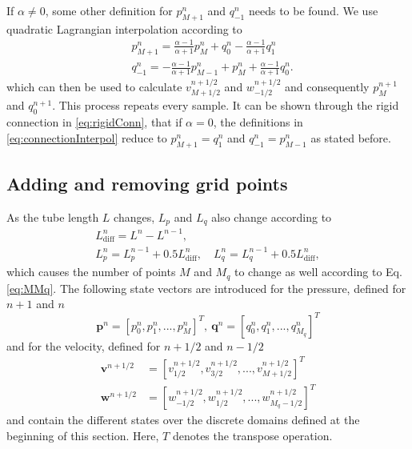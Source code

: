%
If $\alpha \neq 0$, some other definition for $p_{M+1}^n$ and $q_{-1}^n$ needs to be found. We use quadratic Lagrangian interpolation according to
\begin{subequations}\label{eq:connectionInterpol}
\begin{align}
        &p_{M+1}^n = \frac{\alpha - 1}{\alpha + 1}p_{M}^n + q_0^n - \frac{\alpha - 1}{\alpha + 1}q_1^n
    \label{eq:calcPMp1}\\
        &q_{-1}^n
        =-\frac{\alpha - 1}{\alpha + 1}p_{M-1}^n + p_{M}^n+ \frac{\alpha - 1}{\alpha + 1}q_{0}^n.\label{eq:calcQm1}
\end{align}
\end{subequations}
which can then be used to calculate $v_{M+1/2}^{n+1/2}$ and $w_{-1/2}^{n+1/2}$ and consequently $p_M^{n+1}$ and $q_0^{n+1}$. This process repeats every sample. It can be shown through the rigid connection in \eqref{eq:rigidConn}, that if $\alpha=0$, the definitions in \eqref{eq:connectionInterpol} reduce to $p_{M+1}^n = q_1^n$ and $q_{-1}^n = p_{M-1}^n$ as stated before.

\subsection{Adding and removing grid points}\label{sec:addRemove}
As the tube length $L$ changes, $L_p$ and $L_q$ also change according to
\begin{gather}
    L_\text{diff}^n = L^n-L^{n-1},\label{eq:lDiff} \\
    L_p^n = L_p^{n-1} + 0.5 L_\text{diff}^n, \quad L_q^n =  L_q^{n-1} + 0.5L_\text{diff}^n,  
\end{gather}
which causes the number of points $M$ and $M_q$ to change as well according to Eq. \eqref{eq:MMq}. The following state vectors are introduced for the pressure, defined for $n+1$ and $n$ 
\begin{equation}
    \mathbf{p}^n = [p_0^n, p_1^n, ..., p_M^n]^T,\ \mathbf{q}^n = [q_0^n, q_1^n, ..., q_{M_q}^n]^T
\end{equation}
and for the velocity, defined for $n+1/2$ and $n-1/2$
\begin{equation}
    \begin{aligned}
        \mathbf{v}^{n+1/2} &=  [v_{1/2}^{n+1/2}, v_{3/2}^{n+1/2}, ..., v_{M+1/2}^{n+1/2}]^T\\
        \mathbf{w}^{n+1/2} &=  [w_{-1/2}^{n+1/2}, w_{1/2}^{n+1/2}, ..., w_{M_q-1/2}^{n+1/2}]^T
    \end{aligned}
\end{equation}
and contain the different states over the discrete domains defined at the beginning of this section. Here, $T$ denotes the transpose operation.

